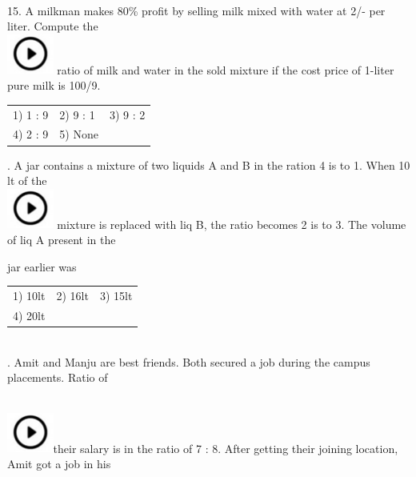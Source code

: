\documentclass{article}
\begin{document}
\noindent 

\noindent 

\noindent  \\  

15. A milkman makes 80\% profit by selling milk mixed with water at 2/- per liter. Compute the  
	\noindent \\ \includegraphics*[width=0.60in, height=0.52in]{images/image1} ratio of milk and water in the sold mixture if the cost price of 1-liter pure milk is 100/9.

\noindent \begin{tabular}{p{1.7in} p{1.6in} p{1.6in}} \\ 
 1) 1 : 9                     &  2) 9 : 1              &  3) 9 : 2              \\
4) 2 : 9              & 5) None \\
\end{tabular}

\noindent 
\newpage
{}. A jar contains a mixture of two liquids A and B in the ration 4 is to 1. When 10 lt of the  
	\noindent \\ \includegraphics*[width=0.60in, height=0.52in]{images/image1} mixture is replaced with liq B, the ratio becomes 2 is to 3. The volume of liq A present in the

\noindent jar earlier was

\noindent 

\noindent \begin{tabular}{p{1.7in} p{1.6in} p{1.6in}} \\ 
 1) 10lt                     &  2) 16lt               &  3) 15lt               \\
4) 20lt \\
\end{tabular}

\noindent  \\  

. Amit and Manju are best friends. Both secured a job during the campus placements. Ratio of

\noindent  
	\noindent \\ \includegraphics*[width=0.60in, height=0.52in]{images/image1}their salary is in the ratio of 7 : 8. After getting their joining location, Amit got a job in his
\end{document}
